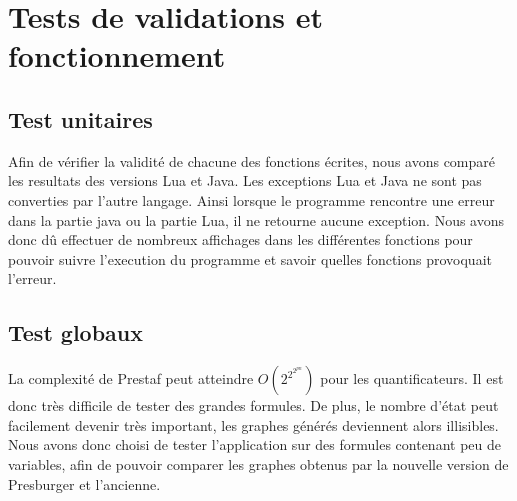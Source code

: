 \section{Tests de validations et fonctionnement}

\subsection{Test unitaires}

Afin de vérifier la validité de chacune des fonctions écrites, nous avons comparé les resultats des versions Lua et Java. Les exceptions Lua et Java ne sont pas converties par l'autre langage. Ainsi lorsque le programme rencontre une erreur dans la partie java ou la partie Lua, il ne retourne aucune exception. Nous avons donc dû effectuer de nombreux affichages dans les différentes fonctions pour pouvoir suivre l'execution du programme et savoir quelles fonctions provoquait l'erreur. 

\subsection{Test globaux}

La complexité de Prestaf peut atteindre $O(2^{2^{2^{pn}}})$ pour les quantificateurs. Il est donc très difficile de tester des grandes formules. De plus, le nombre d'état peut facilement devenir très important, les graphes générés deviennent alors illisibles.
Nous avons donc choisi de tester l'application sur des formules contenant peu de variables, afin de pouvoir comparer les graphes obtenus par la nouvelle version de Presburger et l'ancienne.

